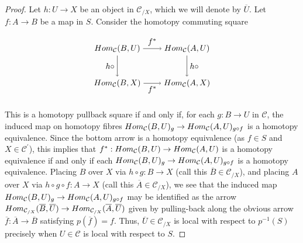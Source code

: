 \documentclass[10pt,a4paper]{amsart}
\newcommand{\C}{\mathcal C}
\begin{document}
\begin{proof}

    Let $h:U\rightarrow X$ be an object in $\C_{/X}$, which we will denote by $\overline{U}$. Let $f:A\rightarrow B$ be a map in $S$. Consider the homotopy commuting square 

    $$
            \begin{tikzpicture}[node distance=1.5cm, auto]
                \node (A) {$ \textnormal{Hom}_\C(B,U)
                $};
                \node (A1) [right of=A] {$ $};
                \node (B) [right of=A1] {$ \textnormal{Hom}_\C(A,U)$};
                \node (C) [below of=A] {$ \textnormal{Hom}_\C(B,X) $};
                \node (D) [below of=B] {$  \textnormal{Hom}_\C(A,X) $};
                \draw[->] (A) to node {$ f^* $} (B);
                \draw[->] (A) to node [swap] {$ h\circ $} (C);
                \draw[->] (C) to node [swap] {$ f^* $} (D);
                \draw[->] (B) to node {$ h\circ $} (D);
            \end{tikzpicture}
    $$

    \noindent This is a homotopy pullback square if and only if, for each $g:B\rightarrow U$ in $\C$, the induced map on homotopy fibres $\textnormal{Hom}_\C(B,U)_{g}\rightarrow \textnormal{Hom}_\C(A,U)_{g\circ f}$ is a homotopy equivalence. Since the bottom arrow is a homotopy equivalence (as $f\in S$ and $X\in \C^\prime$), this implies that $f^*:\textnormal{Hom}_\C(B,U)\rightarrow \textnormal{Hom}_\C(A,U)$ is a homotopy equivalence if and only if each $\textnormal{Hom}_\C(B,U)_{g}\rightarrow \textnormal{Hom}_\C(A,U)_{g\circ f}$ is a homotopy equivalence. Placing $B$ over $X$ via $h\circ g:B\rightarrow X$ (call this $\overline{B}\in \C_{/X}$), and placing $A$ over $X$ via $h\circ g\circ f:A\rightarrow X$ (call this $\overline{A}\in \C_{/X}$), we see that the induced map $\textnormal{Hom}_\C(B,U)_{g}\rightarrow \textnormal{Hom}_\C(A,U)_{g\circ f}$ may be identified as the arrow $\textnormal{Hom}_{\C_{/X}}(\overline{B},\overline{U})\rightarrow \textnormal{Hom}_{\C_{/X}}(\overline{A},\overline{U})$ given by pulling-back along the obvious arrow $\overline{f}:\overline{A}\rightarrow \overline{B}$ satisfying $p(\overline{f})=f$.  Thus, $\overline{U}\in \C_{/X}$ is local with respect to $p^{-1}(S)$ precisely when $U\in \C$ is local with respect to $S$.
    
\end{proof}
\end{document}

